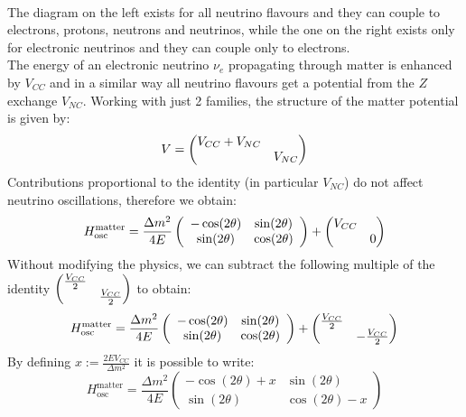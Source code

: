 \documentclass[10.75pt,a4paper,openright,bottom=2cm]{article}
\begin{document}
\begin{minipage}{0.5\textwidth}
\begin{center}
\end{center}
\end{minipage}\\
The diagram on the left exists for all neutrino flavours and they can couple to electrons, protons, neutrons and neutrinos, while the one on the right exists only for electronic neutrinos and they can couple only to electrons.\\
The energy of an electronic neutrino $\nu_e$ propagating through matter is enhanced by $V_{CC}$ and in a similar way all neutrino flavours get a potential from the $Z$ exchange $V_{NC}$. Working with just 2 families, the structure of the matter potential is given by:
\[
V=\mqty(\dmat{V_{CC}+V_{NC},V_{NC}})
\]
Contributions proportional to the identity (in particular $V_{NC}$) do not affect neutrino oscillations, therefore we obtain:
\[
H_{\text{osc}}^{\text{matter}}=\frac{\Delta m^2}{4E}\left(\begin{array}{cc}
    -\cos(2\theta) & \sin(2\theta) \\
    \sin(2\theta) & \cos(2\theta)
\end{array}\right)+\mqty(\dmat{V_{CC},0})
\]
Without modifying the physics, we can subtract the following multiple of the identity $\mqty(\dmat{\frac{V_{CC}}{2},\frac{V_{CC}}{2}})$ to obtain:
\[
H_{\text{osc}}^{\text{matter}}=\frac{\Delta m^2}{4E}\left(\begin{array}{cc}
    -\cos(2\theta) & \sin(2\theta) \\
    \sin(2\theta) & \cos(2\theta)
\end{array}\right)+\mqty(\dmat{\frac{V_{CC}}{2},-\frac{V_{CC}}{2}})
\]
By defining $x:=\frac{2EV_{CC}}{\Delta m^2}$ it is possible to write:
\[
H_{\text{osc}}^{\text{matter}}=\frac{\Delta m^2}{4E}\left(\begin{array}{cc}
    -\cos(2\theta)+x & \sin(2\theta) \\
    \sin(2\theta) & \cos(2\theta)-x
\end{array}\right)
\]
\end{document}

